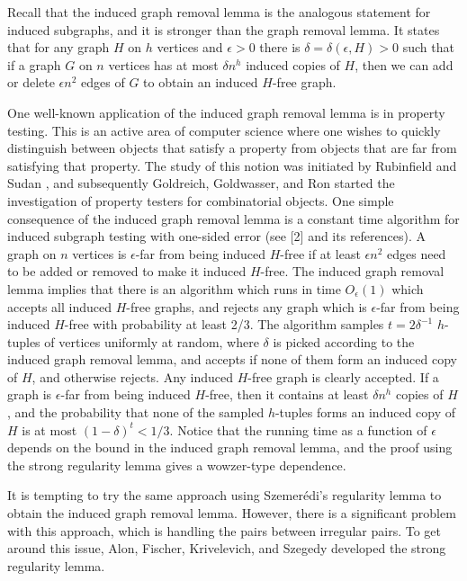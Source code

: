 \documentclass[11pt]{article}
\begin{document}
Recall that the induced graph removal lemma \cite{AFKS} is the analogous
statement for induced subgraphs, and it is stronger than the graph removal
lemma. It states that for any graph $H$ on $h$ vertices and $\epsilon>0$ there
is $\delta=\delta(\epsilon,H)>0$ such that if a graph $G$ on $n$ vertices has
at most $\delta n^h$ induced copies of $H$, then we can add or delete $\epsilon
n^2$ edges of $G$ to obtain an induced $H$-free graph.

One well-known application of the induced graph removal lemma is in property
testing. This is an active area of computer science where one wishes to quickly
distinguish between objects that satisfy a property from objects that are far
from satisfying that property. The study of this notion was initiated by
Rubinfield and Sudan \cite{RuSu}, and subsequently Goldreich, Goldwasser, and
Ron \cite{GGR} started the investigation of property testers for combinatorial
objects. One simple consequence of the induced graph removal lemma is a
constant time algorithm for induced subgraph testing with one-sided error (see
[2] and its references). A graph on $n$ vertices is $\epsilon$-far from being
induced $H$-free if at least $\epsilon n^2$ edges need to be added or removed
to make it induced $H$-free. The induced graph removal lemma implies that there
is an algorithm which runs in time $O_{\epsilon}(1)$ which accepts all induced
$H$-free graphs, and rejects any graph which is $\epsilon$-far from being
induced $H$-free with probability at least 2/3. The algorithm samples $t =
2\delta^{-1}$ $h$-tuples of vertices uniformly at random, where $\delta$ is
picked according to the induced graph removal lemma, and accepts if none of
them form an induced copy of $H$, and otherwise rejects. Any induced $H$-free
graph is clearly accepted. If a graph is $\epsilon$-far from being induced
$H$-free, then it contains at least $\delta n^h$ copies of $H$, and the
probability that none of the sampled $h$-tuples forms an induced copy of $H$ is
at most $(1 -\delta)^t < 1/3$. Notice that the running time as a function of
$\epsilon$ depends on the bound in the induced graph removal lemma, and the
proof using the strong regularity lemma gives a wowzer-type dependence.

It is tempting to try the same approach using Szemer\'edi's regularity lemma to
obtain the induced graph removal lemma.  However, there is a significant
problem with this approach, which is handling the pairs between irregular
pairs. To get around this issue,  Alon, Fischer, Krivelevich, and Szegedy
\cite{AFKS} developed the strong regularity lemma.
\end{document}
